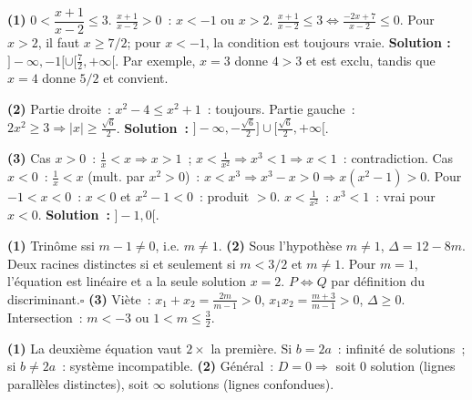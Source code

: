 
\textbf{(1)} $0<\dfrac{x+1}{x-2}\leq3$.
$\frac{x+1}{x-2}>0$~: $x<-1$ ou $x>2$.
$\frac{x+1}{x-2}\leq3\Leftrightarrow\frac{-2x+7}{x-2}\leq0$.
Pour $x>2$, il faut $x\geq7/2$; pour $x<-1$, la condition est toujours vraie.
\textbf{Solution :} $]-\infty,-1[\cup[\tfrac72,+\infty[$.
Par exemple, $x=3$ donne $4>3$ et est exclu, tandis que $x=4$ donne $5/2$ et convient.

\textbf{(2)} Partie droite~: $x^2-4\leq x^2+1$~: toujours.
Partie gauche~: $2x^2\geq3\Rightarrow|x|\geq\tfrac{\sqrt{6}}{2}$.
\textbf{Solution~:} $\bigl]-\infty,-\tfrac{\sqrt{6}}{2}\bigr]\cup\bigl[\tfrac{\sqrt{6}}{2},+\infty\bigr[$.

\textbf{(3)} Cas $x>0$~: $\frac{1}{x}<x\Rightarrow x>1$~;
$x<\frac{1}{x^2}\Rightarrow x^3<1\Rightarrow x<1$~: contradiction.
Cas $x<0$~: $\frac{1}{x}<x$ (mult. par $x^2>0$)~: $x<x^3\Rightarrow x^3-x>0\Rightarrow x(x^2-1)>0$.
Pour $-1<x<0$~: $x<0$ et $x^2-1<0$~: produit $>0$.\checkmark
$x<\frac{1}{x^2}$~: $x^3<1$~: vrai pour $x<0$.
\textbf{Solution~:} $]-1,0[$.


\textbf{(1)} Trin\^ome ssi $m-1\ne0$, i.e. $m\ne1$.
\textbf{(2)} Sous l'hypoth\`ese $m\ne1$, $\Delta=12-8m$.
Deux racines distinctes si et seulement si $m<3/2$ et $m\ne1$.
Pour $m=1$, l'\'equation est lin\'eaire et a la seule solution $x=2$.
$P\Leftrightarrow Q$ par d\'efinition du discriminant.\hfill$\square$
\textbf{(3)} Vi\`ete~: $x_1+x_2=\frac{2m}{m-1}>0$, $x_1x_2=\frac{m+3}{m-1}>0$, $\Delta\geq0$.
Intersection~: $m<-3$ ou $1<m\leq\tfrac{3}{2}$.


\textbf{(1)} La deuxi\`eme \'equation vaut $2\times$ la premi\`ere.
Si $b=2a$~: infinit\'e de solutions~; si $b\ne2a$~: syst\`eme incompatible.
\textbf{(2)} G\'en\'eral~: $D=0\Rightarrow$ soit $0$ solution (lignes parall\`eles distinctes),
soit $\infty$ solutions (lignes confondues).



